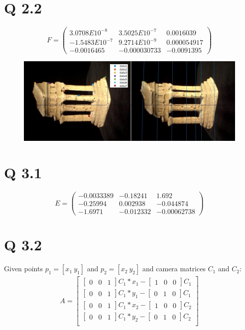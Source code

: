 \documentclass[11pt]{article}
\begin{document}
\section*{Q 2.2}
    $$F=\left(\begin{array}{ccc} 3.0708E{10}^{-8} & 3.5025E{10}^{-7} & 0.0016039\\ -1.5483E{10}^{-7} & 9.
2714E{10}^{-9} & 0.000054917\\ -0.0016465 & -0.000030733 & -0.0091395 \end{array}\right)$$
\begin{figure}[H]
    \centering
    \includegraphics[width=\textwidth]{q2_2.jpg}
\end{figure}
\section*{Q 3.1}
    $$E=\left(\begin{array}{ccc} -0.0033389 & -0.18241 & 1.692\\ -0.25994 & 0.002938 & -0.044874\\ -1.6971 &
 -0.012332 & -0.00062738 \end{array}\right)$$
\section*{Q 3.2}
Given points $p_1 =[x_1\ y_1]$ and $p_2 =[x_2\ y_2]$ and camera matrices $C_1$ and $C_2$: 
\begin{align}
A =\begin{bmatrix}
       \begin{bmatrix}0& 0& 1\end{bmatrix} C_1*x_1 - \begin{bmatrix}1& 0& 0\end{bmatrix} C_1\\
       \begin{bmatrix}0& 0& 1\end{bmatrix} C_1*y_1 - \begin{bmatrix}0& 1& 0\end{bmatrix} C_1\\
       \begin{bmatrix}0& 0& 1\end{bmatrix} C_1*x_2 - \begin{bmatrix}1& 0& 0\end{bmatrix} C_2\\
       \begin{bmatrix}0& 0& 1\end{bmatrix} C_1*y_2 - \begin{bmatrix}0& 1& 0\end{bmatrix} C_2\\
   \end{bmatrix}
\end{align}
\end{document}
